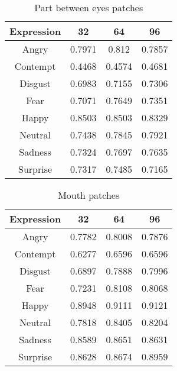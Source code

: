 \begin{table}
\caption{Part between eyes patches}
\label{table:between_eyes}

\begin{tabular}{| c | c | c | c |}
\hline
Expression & 32 &  64  & 96  \\

\hline
Angry & 0.7971 & 0.812 & 0.7857 \\
Contempt & 0.4468 & 0.4574 & 0.4681 \\
Disgust & 0.6983 & 0.7155 & 0.7306 \\
Fear & 0.7071 & 0.7649 & 0.7351 \\
Happy & 0.8503 & 0.8503 & 0.8329 \\
Neutral & 0.7438 & 0.7845 & 0.7921 \\
Sadness & 0.7324 & 0.7697 & 0.7635 \\
Surprise & 0.7317 & 0.7485 & 0.7165 \\

\hline
\end{tabular}
\end{table}


\begin{table}
\caption{Mouth patches}
\label{table:mouth}

\begin{tabular}{| c | c | c | c |}
\hline
Expression & 32 &  64  & 96  \\

\hline
Angry	&	0.7782	&	0.8008	&	0.7876	\\
Contempt	&	0.6277	&	0.6596	&	0.6596	\\
Disgust	&	0.6897	&	0.7888	&	0.7996	\\
Fear	&	0.7231	&	0.8108	&	0.8068	\\
Happy	&	0.8948	&	0.9111	&	0.9121	\\
Neutral	&	0.7818	&	0.8405	&	0.8204	\\
Sadness	&	0.8589	&	0.8651	&	0.8631	\\
Surprise &	0.8628	&	0.8674	&	0.8959	\\


\hline
\end{tabular}
\end{table}